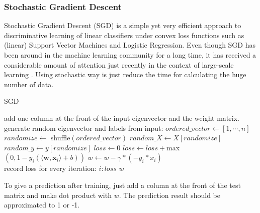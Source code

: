 \documentclass[journal,twoside,web]{ieeecolor}
\begin{document}
\subsubsection{Stochastic Gradient Descent}
Stochastic Gradient Descent (SGD) is a simple yet very efficient approach to discriminative learning of linear classifiers under convex loss functions such as (linear) Support Vector Machines and Logistic Regression. Even though SGD has been around in the machine learning community for a long time, it has received a considerable amount of attention just recently in the context of large-scale learning \cite{scikit-learn}. Using stochastic way is just reduce the time for calculating the huge number of data.
\begin{algorithm}
\caption{SGD}
\begin{algorithmic} [1]
\STATE add one column at the front of the input eigenvector and the weight matrix.\\
generate random eigenvector and labels from input:
\STATE $ordered\_vector \gets [1, \cdots, n]$
\STATE $randomize\gets$ shuffle$(ordered\_vector)$
\STATE $random\_X\gets X[randomize]$
\STATE $random\_y\gets y[randomize]$
\STATE $loss\gets 0$
\STATE $loss \gets loss + $max$(0, 1-y_i(\langle\textbf{w}, \textbf{x}_i\rangle + b))$
\STATE $w \gets w - \gamma * (-y_i * x_i)$
\ENDIF
\\record loss for every iteration:
\PRINT $i: loss$
\ENDFOR
\ENDFOR
\RETURN $w$
\end{algorithmic}
\end{algorithm}

To give a prediction after training, just add a column at the front of the test matrix and make dot product with $w$. The prediction result should be approximated to 1 or -1.
\bigskip
\end{document}
